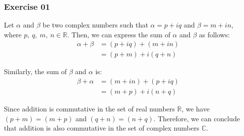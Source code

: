 \subsubsection*{Exercise 01}

\begin{flushleft}
Let $\alpha$ and $\beta$ be two complex numbers such that $\alpha = p + iq$ and $\beta  = m + in$, where $p,\ q,\ m,\ n \in \mathbb{R}$. Then, we can express the sum of $\alpha$ and $\beta$ as follows:
\begin{align*}
\alpha + \beta &= (p + iq) + (m + in) \\
               &= (p + m) + i(q + n)
\end{align*}

Similarly, the sum of $\beta$ and $\alpha$ is:
\begin{align*}
\beta  + \alpha &= (m + in) + (p + iq) \\
                &= (m + p) + i(n + q)
\end{align*}

Since addition is commutative in the set of real numbers $\mathbb{R}$, we have $(p + m) = (m + p)$ and $(q + n) = (n + q)$. Therefore, we can conclude that addition is also commutative in the set of complex numbers $\mathbb{C}$.
\end{flushleft}
